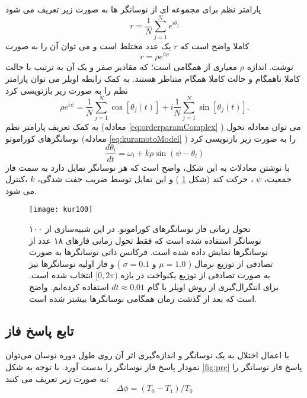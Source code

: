 پارامتر نظم برای مجموعه ای از نوسانگر ها به صورت زیر تعریف می شود
\begin{equation}
    r=\frac{1}{N} \sum_{j=1}^{N} e^{i \theta_j}
    \label{eq:orderParam}
\end{equation}
کاملا واضح است که 
$r$
یک عدد مختلط است و می توان آن را به صورت 
\begin{equation}
    r=\rho e^{i \psi}
    \label{eq:orderparamComplex}
\end{equation}
نوشت. 
اندازه 
$\rho$
معیاری از همگامی است؛ که مقادیر صفر و یک آن به ترتیب با حالت کاملا ناهمگام و حالت کاملا همگام متناظر هستند. به کمک رابطه اویلر می توان پارامتر نظم را به صورت زیر بازنویسی کرد
\begin{equation}
    \rho e^{i \psi} = \frac{1}{N} \sum_{j=1}^{N} \cos [\theta_j(t)] + i \frac{1}{N} \sum_{j=1}^{N} \sin [\theta_j(t)].
    \label{eq:orderParamExpansion}
\end{equation}
به کمک تعریف پارامتر نظم (معادله
\ref{eq:orderparamComplex}
)
می توان معادله تحول نوسانگرهای کوراموتو (معادله
\ref{eq:kuramotoModel}
)
را به صورت زیر بازنویسی کرد
\begin{equation}
      \frac{d \theta_l}{dt} = \omega _l + k \rho \sin ( \psi - \theta_l) 
\end{equation}
با نوشتن معادلات به این شکل، واضح است که هر نوسانگر تمایل دارد به سمت فاز جمعیت،
$\psi$
، حرکت کند (شکل 
\ref{fig:kur100-synch}
) و این تمایل توسط ضریب جفت شدگی، 
$k$
،کنترل می شود. 
\begin{figure}[t!]
	\centering
	\texttt{[image: kur100]}
    \caption{
تحول زمانی فاز نوسانگرهای کوراموتو. در این شبیه‌سازی از ۱۰۰ نوسانگر استفاده شده است که فقط تحول زمانی فازهای ۱۸ عدد از نوسانگرها نمایش داده شده است. فرکانس ذاتی نوسانگرها به صورت تصادفی از توزیع نرمال (
$\mu=1.0$  و $\sigma=0.1$
) و فاز اولیه نوسانگرها نیز به صورت تصادفی از توزیع یکنواخت در بازه 
$[0,2\pi)$
انتخاب شده است. برای انتگرال‌گیری از روش اویلر با گام 
$dt\approx 0.01$
استفاده کرده‌ایم. واضح است که بعد از گذشت زمان همگامی نوسانگرها بیشتر شده است.
    }
    \label{fig:kur100-synch}
\end{figure}


\subsection{تابع پاسخ فاز}
با اعمال اختلال به یک نوسانگر و اندازه‌گیری اثر آن روی طول دوره نوسان می‌توان نمودار پاسخ فاز
 نوسانگر را بدست آورد. با توجه به شکل
 \ref{fig:prc}
پاسخ فاز نوسانگر را به صورت زیر تعریف می کنند:
\begin{equation}
\Delta \phi = (T_0 - T_1)/T_0
\label{eq:prc}
\end{equation}

